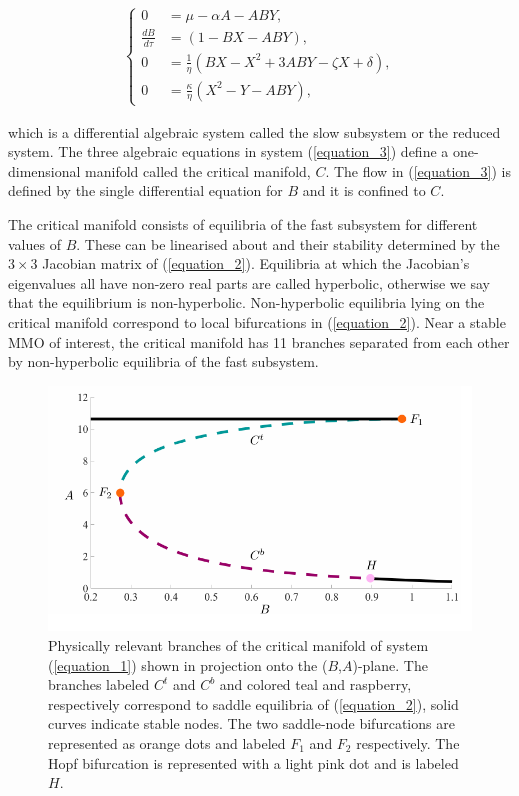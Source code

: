 \documentclass{ws-ijbc}
\begin{document}
 \begin{equation}
\begin{aligned}
\begin{cases}
0 &= \mu - \alpha A - ABY, \\
\frac{dB}{d\tau} &= (1-BX - ABY), \\
0 &= \frac{1}{\eta}(BX - X^2 +3ABY - \zeta X + \delta), \\
0 &= \frac{\kappa}{\eta}(X^2 - Y - ABY),
\end{cases}
\end{aligned}
\label{equation_3}
\end{equation}
    
\noindent
which is a differential algebraic system called the slow subsystem or the reduced system. The three algebraic equations in system (\ref{equation_3}) define a one-dimensional manifold called the critical manifold, $C$.  The flow in (\ref{equation_3}) is defined by the single differential equation for $B$ and it is confined to $C$.  

The critical manifold consists of equilibria of the fast subsystem for different values of $B$. These can be linearised about and their stability determined by the $3\times3$ Jacobian matrix of (\ref{equation_2}).  Equilibria at which the Jacobian's eigenvalues all have non-zero real parts are called hyperbolic, otherwise we say that the equilibrium is non-hyperbolic.  Non-hyperbolic equilibria lying on the critical manifold correspond to local bifurcations in (\ref{equation_2}).  Near a stable MMO of interest, the critical manifold has 11 branches separated from each other by non-hyperbolic equilibria of the fast subsystem.

\begin{figure}[!t]
\begin{center}
\includegraphics[page=1, width=\textwidth]{figures.pdf}
\end{center}
\caption{Physically relevant branches of the critical manifold of system (\ref{equation_1}) shown in projection onto the ($B$,$A$)-plane.  The branches labeled $C^t$ and $C^b$ and colored teal and raspberry, respectively correspond to saddle equilibria of (\ref{equation_2}), solid curves indicate stable nodes.  The two saddle-node bifurcations are represented as orange dots and labeled $F_1$ and $F_2$ respectively.  The Hopf bifurcation is represented with a light pink dot and is labeled $H$.}
\label{critical_figure}
\end{figure}
\end{document}
